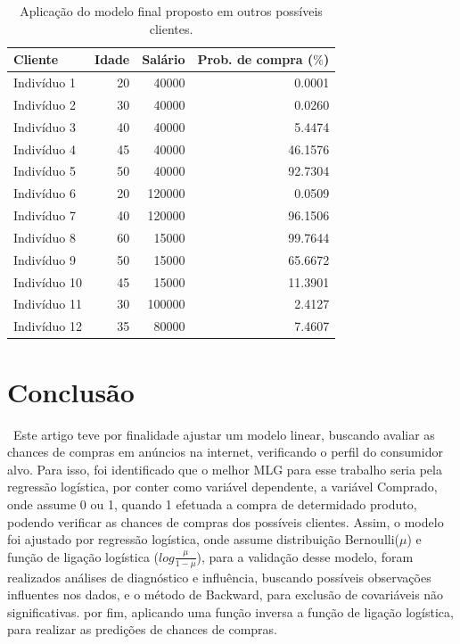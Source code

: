 \documentclass[a4paper]{article}
\begin{document}
\begin{table}[H] 
\caption{Aplicação do modelo final proposto em outros possíveis clientes.}
\begin{center}
\begin{tabular}{lrrr}
\hline
 Cliente & Idade & Salário & Prob. de compra ($\%$)\\
 \hline
Indivíduo 1 & 20 & 40000 & 0.0001\\
Indivíduo 2 & 30 & 40000 & 0.0260\\
Indivíduo 3 & 40 & 40000 & 5.4474\\
Indivíduo 4 & 45 & 40000 & 46.1576\\
Indivíduo 5 & 50 & 40000 & 92.7304\\
Indivíduo 6 & 20 & 120000 & 0.0509\\
Indivíduo 7 & 40 & 120000 & 96.1506\\
Indivíduo 8 & 60 & 15000 & 99.7644\\
Indivíduo 9 & 50 & 15000 & 65.6672\\
Indivíduo 10 & 45 & 15000 & 11.3901\\
Indivíduo 11 & 30 & 100000 & 2.4127\\
Indivíduo 12 & 35 & 80000 & 7.4607\\
\hline
\end{tabular}
\label{tab7}
\end{center}
\end{table}

\section{Conclusão}

\quad \ Este artigo teve por finalidade ajustar um modelo linear, buscando avaliar as chances de compras em anúncios na internet, verificando o perfil do consumidor alvo. Para isso, foi identificado que o melhor MLG para esse trabalho seria pela regressão logística, por conter como variável dependente, a variável Comprado, onde assume 0 ou 1, quando 1 efetuada a compra de determidado produto, podendo verificar as chances de compras dos possíveis clientes. Assim, o modelo foi ajustado por regressão logística, onde assume distribuição Bernoulli($\mu$) e função de ligação logística ($log\frac{\mu}{1-\mu}$), para a validação desse modelo, foram realizados análises de diagnóstico e influência, buscando possíveis observações influentes nos dados, e o  método de Backward, para exclusão de covariáveis não significativas. por fim, aplicando uma função inversa a função de ligação logística, para realizar as predições de chances de compras.
\end{document}
